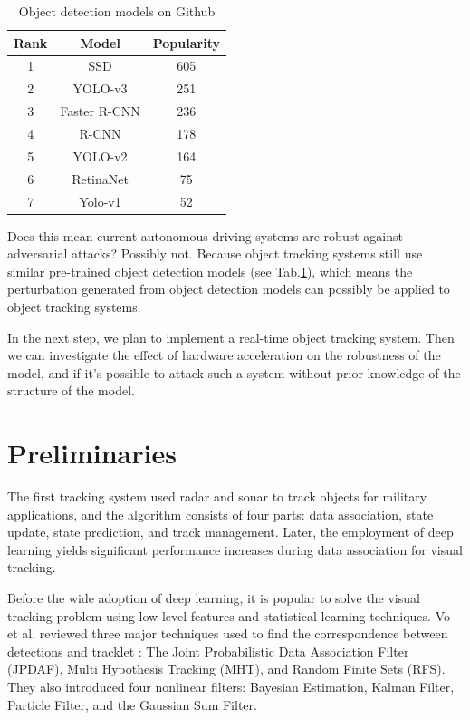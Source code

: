 \begin{table}[H]
\centering
\begin{tabular}{ ccc } 
\hline
Rank & Model & Popularity \\
\hline
1 & SSD & 605 \\ 
2 & YOLO-v3 & 251 \\ 
3 & Faster R-CNN & 236 \\ 
4 & R-CNN & 178 \\ 
5 & YOLO-v2 & 164 \\ 
6 & RetinaNet & 75 \\ 
7 & Yolo-v1 & 52 \\ 
\hline
\end{tabular}
\caption{Object detection models on Github  \citep{wang2021daedalus}}
\label{tab.detection_github}
\end{table}

Does this mean current autonomous driving systems are robust against adversarial attacks? Possibly not. Because object tracking systems still use similar pre-trained object detection models (see Tab.\ref{tab.detection_github}), which means the perturbation generated from object detection models can possibly be applied to object tracking systems.

In the next step, we plan to implement a real-time object tracking system. Then we can investigate the effect of hardware acceleration on the robustness of the model, and if it's possible to attack such a system without prior knowledge of the structure of the model.

\section{Preliminaries}
\label{sec:intro}

The first tracking system used radar and sonar to track objects for military applications, and the algorithm consists of four parts: data association, state update, state prediction, and track management. Later, the employment of deep learning yields significant performance increases during data association for visual tracking.

Before the wide adoption of deep learning, it is popular to solve the visual tracking problem using low-level features and statistical learning techniques. Vo et al. reviewed three major techniques used to find the correspondence between detections and tracklet \citep{vo2015multitarget}: The Joint Probabilistic Data Association Filter (JPDAF), Multi Hypothesis Tracking (MHT), and Random Finite Sets (RFS). They also introduced four nonlinear filters: Bayesian Estimation, Kalman Filter, Particle Filter, and the Gaussian Sum Filter.

